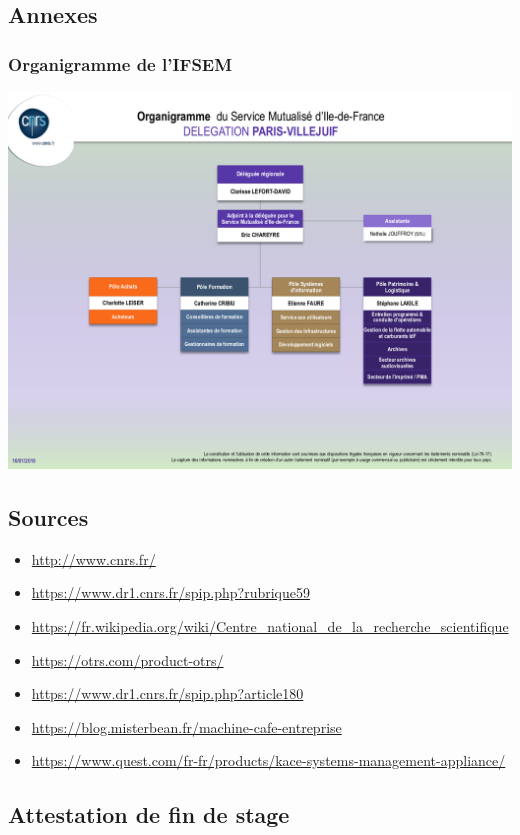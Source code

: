 \subsection{Annexes}
\subsubsection{Organigramme de l'IFSEM}
\centerline{\includegraphics[width=15cm]{./images/ifsemorga.png}}

\subsection{Sources}
\begin{itemize}
    \item \url{http://www.cnrs.fr/}
    \item \url{https://www.dr1.cnrs.fr/spip.php?rubrique59}
    \item \url{https://fr.wikipedia.org/wiki/Centre_national_de_la_recherche_scientifique}
    \item \url{https://otrs.com/product-otrs/}
    \item \url{https://www.dr1.cnrs.fr/spip.php?article180}
    \item \url{https://blog.misterbean.fr/machine-cafe-entreprise}
    \item \url{https://www.quest.com/fr-fr/products/kace-systems-management-appliance/}
\end{itemize}
\newpage
\subsection{Attestation de fin de stage}
\newpage
